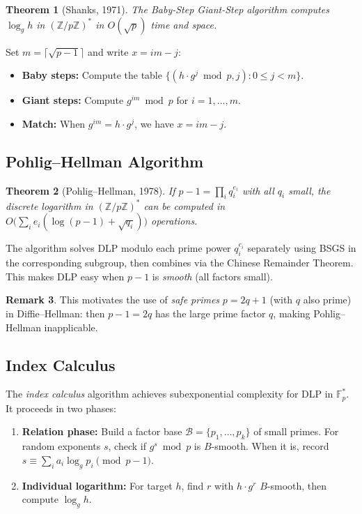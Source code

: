 \documentclass[12pt,a4paper]{amsart}
\newtheorem{theorem}{Theorem}[section]
\theoremstyle{definition}
\newtheorem{remark}[theorem]{Remark}
\begin{document}
\begin{theorem}[Shanks, 1971]
The Baby-Step Giant-Step algorithm computes $\log_g h$ in $(\mathbb{Z}/p\mathbb{Z})^*$
in $O(\sqrt{p})$ time and space.
\end{theorem}

Set $m = \lceil\sqrt{p-1}\rceil$ and write $x = im - j$:
\begin{itemize}
  \item \textbf{Baby steps:} Compute the table $\{(h \cdot g^j \bmod p, j) : 0 \le j < m\}$.
  \item \textbf{Giant steps:} Compute $g^{im} \bmod p$ for $i = 1, \ldots, m$.
  \item \textbf{Match:} When $g^{im} = h \cdot g^j$, we have $x = im - j$.
\end{itemize}

\subsection{Pohlig--Hellman Algorithm}

\begin{theorem}[Pohlig--Hellman, 1978]
If $p-1 = \prod_i q_i^{e_i}$ with all $q_i$ small, the discrete logarithm
in $(\mathbb{Z}/p\mathbb{Z})^*$ can be computed in
$O\bigl(\sum_i e_i(\log(p-1) + \sqrt{q_i})\bigr)$ operations.
\end{theorem}

The algorithm solves DLP modulo each prime power $q_i^{e_i}$ separately using
BSGS in the corresponding subgroup, then combines via the Chinese Remainder
Theorem. This makes DLP easy when $p-1$ is \emph{smooth} (all factors small).

\begin{remark}
This motivates the use of \emph{safe primes} $p = 2q+1$ (with $q$ also prime)
in Diffie--Hellman: then $p-1 = 2q$ has the large prime factor $q$, making
Pohlig--Hellman inapplicable.
\end{remark}

\subsection{Index Calculus}

The \emph{index calculus} algorithm achieves subexponential complexity for DLP
in $\mathbb{F}_p^*$. It proceeds in two phases:

\begin{enumerate}[label=\arabic*.]
  \item \textbf{Relation phase:} Build a factor base $\mathcal{B} = \{p_1,\ldots,p_k\}$
    of small primes. For random exponents $s$, check if $g^s \bmod p$ is
    $B$-smooth. When it is, record $s \equiv \sum_i a_i \log_g p_i \pmod{p-1}$.
  \item \textbf{Individual logarithm:} For target $h$, find $r$ with
    $h \cdot g^r$ $B$-smooth, then compute $\log_g h$.
\end{enumerate}
\end{document}
